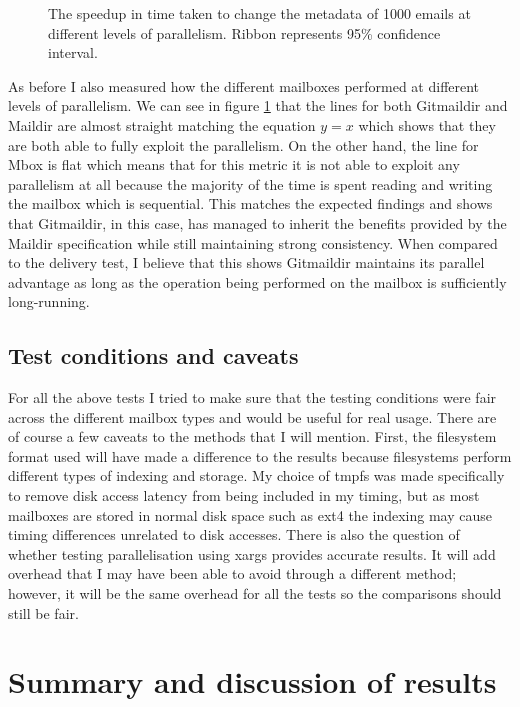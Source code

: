 \begin{figure}[h]
    \centering
    
    \caption{The speedup in time taken to change the metadata of 1000 emails at different levels of parallelism. Ribbon represents 95\% confidence interval.}
    \label{fig:tmpp_speedup_combined}
\end{figure}

As before I also measured how the different mailboxes performed at different levels of parallelism. We can see in figure \ref{fig:tmpp_speedup_combined} that the lines for both Gitmaildir and Maildir are almost straight matching the equation $y=x$ which shows that they are both able to fully exploit the parallelism. On the other hand, the line for Mbox is flat which means that for this metric it is not able to exploit any parallelism at all because the majority of the time is spent reading and writing the mailbox which is sequential. This matches the expected findings and shows that Gitmaildir, in this case, has managed to inherit the benefits provided by the Maildir specification while still maintaining strong consistency. When compared to the delivery test, I believe that this shows Gitmaildir maintains its parallel advantage as long as the operation being performed on the mailbox is sufficiently long-running.

\subsection{Test conditions and caveats}

For all the above tests I tried to make sure that the testing conditions were fair across the different mailbox types and would be useful for real usage. There are of course a few caveats to the methods that I will mention. First, the filesystem format used will have made a difference to the results because filesystems perform different types of indexing and storage. My choice of tmpfs was made specifically to remove disk access latency from being included in my timing, but as most mailboxes are stored in normal disk space such as ext4 the indexing may cause timing differences unrelated to disk accesses. There is also the question of whether testing parallelisation using xargs provides accurate results. It will add overhead that I may have been able to avoid through a different method; however, it will be the same overhead for all the tests so the comparisons should still be fair.

\section{Summary and discussion of results}

